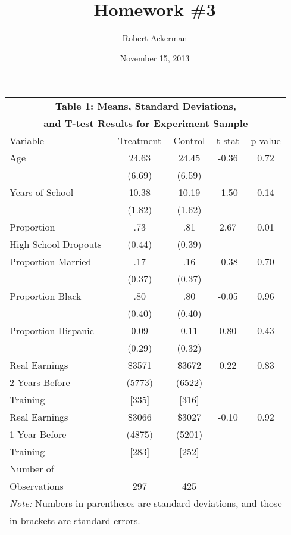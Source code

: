 \documentclass[11pt]{article}
\title{Homework \#3}
\author{Robert Ackerman}
\date{November 15, 2013}							%
\theoremstyle{definition}
\begin{document}
\maketitle
\section{}
\indent
\par
\vspace{2.5mm}
\noindent
\begin{center}
\begin{tabular}{|l| c |c |c |c|}
\hline\hline
\multicolumn{5}{c}{\textbf{Table 1: Means, Standard Deviations, }} \\
\multicolumn{5}{c}{\textbf{and T-test Results for Experiment Sample}} \\
\hline\hline
Variable & Treatment & Control & t-stat & p-value \\
\hline
Age & 24.63 & 24.45 & -0.36 & 0.72 \\
 & (6.69) & (6.59) & & \\
 \hline
Years of School & 10.38 & 10.19 & -1.50 & 0.14 \\
 & (1.82) & (1.62) & & \\
 \hline
Proportion  & .73 & .81  & 2.67 & 0.01 \\ 
High School Dropouts & (0.44) & (0.39) & & \\ 
\hline
Proportion Married & .17 & .16  & -0.38 & 0.70 \\ 
 & (0.37) & (0.37) & & \\ 
 \hline
 Proportion Black & .80 & .80  & -0.05 & 0.96 \\ 
 & (0.40) & (0.40) & & \\ 
 \hline
Proportion Hispanic& 0.09 & 0.11  & 0.80 & 0.43 \\ 
 & (0.29) & (0.32) & & \\ 
  \hline
Real Earnings & \$3571 & \$3672  & 0.22 & 0.83 \\ 
2 Years Before & (5773) & (6522) & & \\ 
Training & [335] & [316] & & \\ 
\hline
Real Earnings & \$3066 & \$3027  & -0.10 & 0.92 \\ 
1 Year Before & (4875) & (5201) & & \\ 
Training & [283] & [252] & & \\ 
\hline
Number of & &  & & \\
Observations & 297 & 425 & & \\
\hline\hline
\multicolumn{5}{l}{\textit{Note:} Numbers in parentheses are standard deviations, and those} \\
\multicolumn{5}{l}{in brackets are standard errors.} 
\end{tabular} 
\end{center}  
\end{document}
